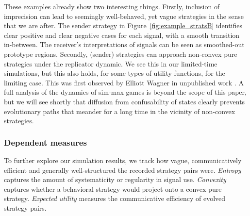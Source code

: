 \documentclass[fleqn,reqno,10pt]{article}
\begin{document}
These examples already show two interesting things. Firstly, inclusion
of imprecision can lead to seemingly well-behaved, yet vague
strategies in the sense that we are after. The sender strategy in
Figure~\ref{fig:example_stratsB} identifies clear positive and clear
negative cases for each signal, with a smooth transition
in-between. The receiver's interpretations of signals can be seen as
smoothed-out prototype regions. Secondly, (sender) strategies can
approach non-convex pure strategies under the replicator dynamic. We
see this in our limited-time simulations, but this also holds, for
some types of utility functions, for the limiting case. This was first
observed by Elliott Wagner in unpublished work
\citep[c.f.][]{OConnor2013:Evolving-Percep}. A full analysis of the
dynamics of sim-max games is beyond the scope of this paper, but we
will see shortly that diffusion from confusability of states clearly
prevents evolutionary paths that meander for a long time in the
vicinity of non-convex strategies.



\subsubsection{Dependent measures}
 
To further explore our simulation results, we track how vague,
communicatively efficient and generally well-structured the recorded
strategy pairs were. \emph{Entropy} captures the amount of
systematicity or regularity in signal use. \emph{Convexity} captures
whether a behavioral strategy would project onto a convex pure
strategy. \emph{Expected utility} measures the communicative
efficiency of evolved strategy pairs.
\end{document}
